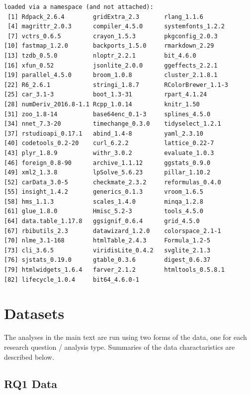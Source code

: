 \documentclass[
  letterpaper,
  DIV=11,
  numbers=noendperiod]{scrreprt}
\begin{document}
\begin{verbatim}
loaded via a namespace (and not attached):
 [1] Rdpack_2.6.4        gridExtra_2.3       rlang_1.1.6        
 [4] magrittr_2.0.3      compiler_4.5.0      systemfonts_1.2.2  
 [7] vctrs_0.6.5         crayon_1.5.3        pkgconfig_2.0.3    
[10] fastmap_1.2.0       backports_1.5.0     rmarkdown_2.29     
[13] tzdb_0.5.0          nloptr_2.2.1        bit_4.6.0          
[16] xfun_0.52           jsonlite_2.0.0      ggeffects_2.2.1    
[19] parallel_4.5.0      broom_1.0.8         cluster_2.1.8.1    
[22] R6_2.6.1            stringi_1.8.7       RColorBrewer_1.1-3 
[25] car_3.1-3           boot_1.3-31         rpart_4.1.24       
[28] numDeriv_2016.8-1.1 Rcpp_1.0.14         knitr_1.50         
[31] zoo_1.8-14          base64enc_0.1-3     splines_4.5.0      
[34] nnet_7.3-20         timechange_0.3.0    tidyselect_1.2.1   
[37] rstudioapi_0.17.1   abind_1.4-8         yaml_2.3.10        
[40] codetools_0.2-20    curl_6.2.2          lattice_0.22-7     
[43] plyr_1.8.9          withr_3.0.2         evaluate_1.0.3     
[46] foreign_0.8-90      archive_1.1.12      ggstats_0.9.0      
[49] xml2_1.3.8          lpSolve_5.6.23      pillar_1.10.2      
[52] carData_3.0-5       checkmate_2.3.2     reformulas_0.4.0   
[55] insight_1.4.2       generics_0.1.3      vroom_1.6.5        
[58] hms_1.1.3           scales_1.4.0        minqa_1.2.8        
[61] glue_1.8.0          Hmisc_5.2-3         tools_4.5.0        
[64] data.table_1.17.8   ggsignif_0.6.4      grid_4.5.0         
[67] rbibutils_2.3       datawizard_1.2.0    colorspace_2.1-1   
[70] nlme_3.1-168        htmlTable_2.4.3     Formula_1.2-5      
[73] cli_3.6.5           viridisLite_0.4.2   svglite_2.1.3      
[76] sjstats_0.19.0      gtable_0.3.6        digest_0.6.37      
[79] htmlwidgets_1.6.4   farver_2.1.2        htmltools_0.5.8.1  
[82] lifecycle_1.0.4     bit64_4.6.0-1      
\end{verbatim}

\section{Datasets}\label{datasets}

The analyses in the main text are run using two forms of the data, one
for each research question / analysis type. Summaries of the data
charactaristics are described below.

\subsection{RQ1 Data}\label{rq1-data}
\end{document}
